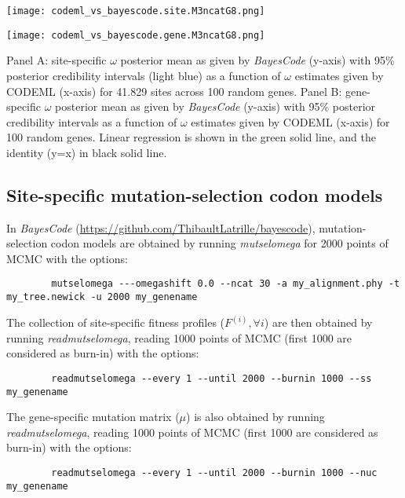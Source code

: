 \documentclass{article}
\renewcommand*{\bm}[1]{#1}%
\newcommand{\UniDimArray}[1]{\bm{#1}}
\begin{document}
    \begin{center}
        \begin{minipage}{0.49\linewidth}
            \texttt{[image: codeml\_vs\_bayescode.site.M3ncatG8.png]}
        \end{minipage}
        \hfill
        \begin{minipage}{0.49\linewidth}
            \texttt{[image: codeml\_vs\_bayescode.gene.M3ncatG8.png]}
        \end{minipage}
        \hfill
    \end{center}
    Panel A: site-specific $\omega$ posterior mean as given by \textit{BayesCode} (y-axis) with 95\% posterior credibility intervals (light blue) as a function of  $\omega$ estimates given by CODEML (x-axis) for 41.829 sites across 100 random genes.
    Panel B: gene-specific $\omega$ posterior mean as given by \textit{BayesCode} (y-axis) with 95\% posterior credibility intervals  as a function of $\omega$ estimates given by CODEML (x-axis) for 100 random genes.
    Linear regression is shown in the green solid line, and the identity (y=x) in black solid line.

    \subsection{Site-specific mutation-selection codon models}

    In \textit{BayesCode} (\url{https://github.com/ThibaultLatrille/bayescode}), mutation-selection codon models are obtained by running \textit{mutselomega} for 2000 points of MCMC with the options:
    \begin{scriptsize}
        \begin{verbatim}
        mutselomega ---omegashift 0.0 --ncat 30 -a my_alignment.phy -t my_tree.newick -u 2000 my_genename
        \end{verbatim}
    \end{scriptsize}
    The collection of site-specific fitness profiles ($\UniDimArray{F^{(i)}}, \forall i$) are then obtained by running \textit{readmutselomega}, reading 1000 points of MCMC (first 1000 are considered as burn-in) with the options:
    \begin{scriptsize}
        \begin{verbatim}
        readmutselomega --every 1 --until 2000 --burnin 1000 --ss my_genename
        \end{verbatim}
    \end{scriptsize}
    The gene-specific mutation matrix ($\UniDimArray{\mu}$) is also obtained by running \textit{readmutselomega}, reading 1000 points of MCMC (first 1000 are considered as burn-in) with the options:
    \begin{scriptsize}
        \begin{verbatim}
        readmutselomega --every 1 --until 2000 --burnin 1000 --nuc my_genename
        \end{verbatim}
    \end{scriptsize}
\end{document}
